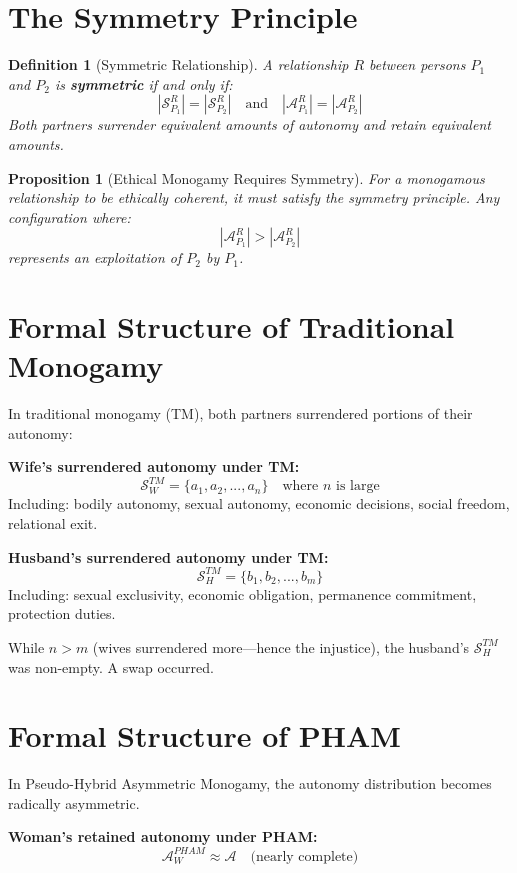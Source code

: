 \documentclass[12pt,openany]{book}
\newtheorem{definition}{Definition}[chapter]
\newtheorem{proposition}{Proposition}[chapter]
\numberwithin{equation}{chapter}
\begin{document}
\section{The Symmetry Principle}

\begin{definition}[Symmetric Relationship]
A relationship $R$ between persons $P_1$ and $P_2$ is \textbf{symmetric} if and only if:
\[
|\mathcal{S}_{P_1}^R| = |\mathcal{S}_{P_2}^R| \quad \text{and} \quad |\mathcal{A}_{P_1}^R| = |\mathcal{A}_{P_2}^R|
\]
Both partners surrender equivalent amounts of autonomy and retain equivalent amounts.
\end{definition}

\begin{proposition}[Ethical Monogamy Requires Symmetry]
For a monogamous relationship to be ethically coherent, it must satisfy the symmetry principle. Any configuration where:
\[
|\mathcal{A}_{P_1}^R| > |\mathcal{A}_{P_2}^R|
\]
represents an exploitation of $P_2$ by $P_1$.
\end{proposition}

\section{Formal Structure of Traditional Monogamy}

In traditional monogamy (TM), both partners surrendered portions of their autonomy:

\textbf{Wife's surrendered autonomy under TM:}
\[
\mathcal{S}_W^{TM} = \{a_1, a_2, ..., a_n\} \quad \text{where } n \text{ is large}
\]
Including: bodily autonomy, sexual autonomy, economic decisions, social freedom, relational exit.

\textbf{Husband's surrendered autonomy under TM:}
\[
\mathcal{S}_H^{TM} = \{b_1, b_2, ..., b_m\}
\]
Including: sexual exclusivity, economic obligation, permanence commitment, protection duties.

While $n > m$ (wives surrendered more---hence the injustice), the husband's $\mathcal{S}_H^{TM}$ was non-empty. A swap occurred.

\section{Formal Structure of PHAM}

In Pseudo-Hybrid Asymmetric Monogamy, the autonomy distribution becomes radically asymmetric.

\textbf{Woman's retained autonomy under PHAM:}
\[
\mathcal{A}_W^{PHAM} \approx \mathcal{A} \quad \text{(nearly complete)}
\]
\end{document}
